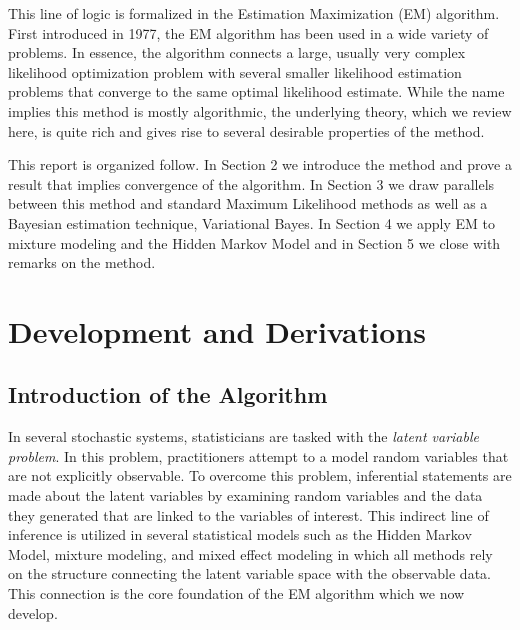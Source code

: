 \documentclass{article}
\begin{document}
This line of logic is formalized in the Estimation Maximization (EM) algorithm. First introduced in 1977, the EM algorithm has been used in a wide variety of problems. In essence, the algorithm connects a large, usually very complex likelihood optimization problem with several smaller likelihood estimation problems that converge to the same optimal likelihood estimate. While the name implies this method is mostly algorithmic, the underlying theory, which we review here, is quite rich and gives rise to several desirable properties of the method. 

This report is organized follow. In Section 2 we introduce the method and prove a result that implies convergence of the algorithm. In Section 3 we draw parallels between this method and standard Maximum Likelihood methods as well as a Bayesian estimation technique, Variational Bayes. In Section 4 we apply EM to mixture modeling and the Hidden Markov Model and in Section 5 we close with remarks on the method. 

\section{Development and Derivations}

\subsection{Introduction of the Algorithm}
In several stochastic systems, statisticians are tasked with the \textit{latent variable problem}. In this problem, practitioners attempt to a model random variables that are not explicitly observable. To overcome this problem, inferential statements are made about the latent variables by examining random variables and the data they generated that are linked to the variables of interest. This indirect line of inference is utilized in several statistical models such as the Hidden Markov Model, mixture modeling, and mixed effect modeling in which all methods rely on the structure connecting the latent variable space with the observable data. This connection is the core foundation of the EM algorithm which we now develop. 
\end{document}
